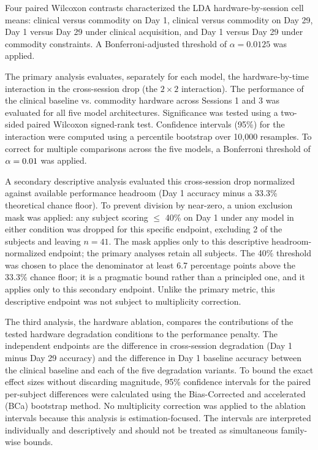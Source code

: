 \documentclass[preprint,12pt]{elsarticle}
\begin{document}
Four paired Wilcoxon contrasts characterized the LDA hardware-by-session cell means: clinical versus commodity on Day 1, clinical versus commodity on Day 29, Day 1 versus Day 29 under clinical acquisition, and Day 1 versus Day 29 under commodity constraints. A Bonferroni-adjusted threshold of $\alpha = 0.0125$ was applied.

The primary analysis evaluates, separately for each model, the hardware-by-time interaction in the cross-session drop (the $2\times2$ interaction). The performance of the clinical baseline vs. commodity hardware across Sessions 1 and 3 was evaluated for all five model architectures. Significance was tested using a two-sided paired Wilcoxon signed-rank test. Confidence intervals (95\%) for the interaction were computed using a percentile bootstrap over 10,000 resamples. To correct for multiple comparisons across the five models, a Bonferroni threshold of $\alpha = 0.01$ was applied.

A secondary descriptive analysis evaluated this cross-session drop normalized against available performance headroom (Day 1 accuracy minus a 33.3\% theoretical chance floor). To prevent division by near-zero, a union exclusion mask was applied: any subject scoring $\le$ 40\% on Day 1 under any model in either condition was dropped for this specific endpoint, excluding 2 of the \nSubjects{} subjects and leaving $n=41$. The mask applies only to this descriptive headroom-normalized endpoint; the primary analyses retain all \nSubjects{} subjects. The 40\% threshold was chosen to place the denominator at least 6.7 percentage points above the 33.3\% chance floor; it is a pragmatic bound rather than a principled one, and it applies only to this secondary endpoint. Unlike the primary metric, this descriptive endpoint was not subject to multiplicity correction.

The third analysis, the hardware ablation, compares the contributions of the tested hardware degradation conditions to the performance penalty. The independent endpoints are the difference in cross-session degradation (Day 1 minus Day 29 accuracy) and the difference in Day 1 baseline accuracy between the clinical baseline and each of the five degradation variants. To bound the exact effect sizes without discarding magnitude, 95\% confidence intervals for the paired per-subject differences were calculated using the Bias-Corrected and accelerated (BCa) bootstrap method. No multiplicity correction was applied to the ablation intervals because this analysis is estimation-focused. The intervals are interpreted individually and descriptively and should not be treated as simultaneous family-wise bounds.
\end{document}
